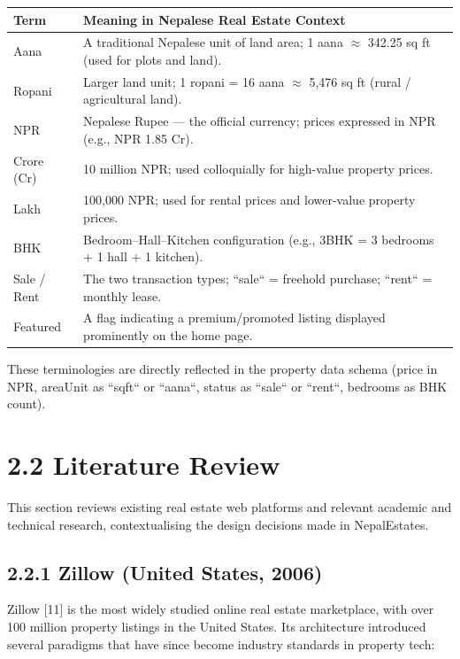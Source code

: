 \documentclass[12pt,a4paper]{report}
\begin{document}
\begin{center}
\begin{tabular}{|l|l|}
\hline
Term & Meaning in Nepalese Real Estate Context \\
\hline
Aana & A traditional Nepalese unit of land area; 1 aana $\approx$ 342.25 sq ft (used for plots and land). \\
\hline
Ropani & Larger land unit; 1 ropani = 16 aana $\approx$ 5,476 sq ft (rural / agricultural land). \\
\hline
NPR & Nepalese Rupee --- the official currency; prices expressed in NPR (e.g., NPR 1.85 Cr). \\
\hline
Crore (Cr) & 10 million NPR; used colloquially for high-value property prices. \\
\hline
Lakh & 100,000 NPR; used for rental prices and lower-value property prices. \\
\hline
BHK & Bedroom--Hall--Kitchen configuration (e.g., 3BHK = 3 bedrooms + 1 hall + 1 kitchen). \\
\hline
Sale / Rent & The two transaction types; ``sale`` = freehold purchase; ``rent`` = monthly lease. \\
\hline
Featured & A flag indicating a premium/promoted listing displayed prominently on the home page. \\
\hline
\end{tabular}
\end{center}

These terminologies are directly reflected in the property data schema (price in NPR, areaUnit as ``sqft`` or ``aana``, status as ``sale`` or ``rent``, bedrooms as BHK count).

\section{2.2 Literature Review}
This section reviews existing real estate web platforms and relevant academic and technical research, contextualising the design decisions made in NepalEstates.

\subsection{2.2.1 Zillow (United States, 2006)}
Zillow [11] is the most widely studied online real estate marketplace, with over 100 million property listings in the United States. Its architecture introduced several paradigms that have since become industry standards in property tech:
\end{document}
